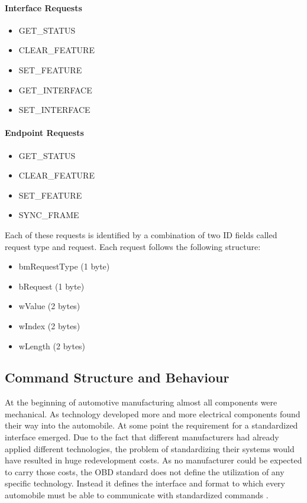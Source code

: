 \paragraph{Interface Requests}
\begin{itemize}
 \item GET\_STATUS
 \item CLEAR\_FEATURE
 \item SET\_FEATURE
 \item GET\_INTERFACE
 \item SET\_INTERFACE
\end{itemize}

\paragraph{Endpoint Requests}
\begin{itemize}
 \item GET\_STATUS
 \item CLEAR\_FEATURE
 \item SET\_FEATURE
 \item SYNC\_FRAME
\end{itemize}

Each of these requests is identified by a combination of two ID fields called request type and request. Each request follows the 
following structure:

\begin{itemize}
 \item bmRequestType (1 byte)
 \item bRequest (1 byte)
 \item wValue (2 bytes)
 \item wIndex (2 bytes)
 \item wLength (2 bytes)
\end{itemize}

\subsection{Command Structure and Behaviour}
\label{sec:CSaB}

At the beginning of automotive manufacturing almost all components were mechanical. As technology developed more and more electrical 
components found their way into the automobile. At some point the requirement for a standardized interface emerged. Due to the fact 
that different manufacturers had already applied different technologies, the problem of standardizing their systems would have 
resulted in huge redevelopment costs. As no manufacturer could be expected to carry those costs, the OBD standard does not define the 
utilization of any specific technology. Instead it defines the interface and format to which every automobile must be able to 
communicate with standardized commands \cite{SCHAFOBD1}.

